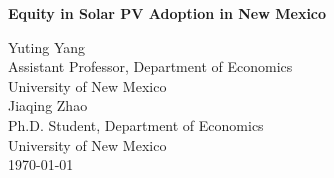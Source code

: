 \begin{titlepage}

\newcommand{\HRule}{\rule{\linewidth}{0.5mm}} %





\begin{center} %



{ \huge \bfseries Equity in Solar PV Adoption in New Mexico}\\ %
\end{center}
\vspace{1.5em}

\begin{center}
    \large
Yuting Yang\\ %
Assistant Professor, Department of Economics\\
University of New Mexico\\
\vspace{1em}
Jiaqing Zhao\\ %
Ph.D. Student, Department of Economics\\
University of New Mexico\\
\vspace{1.5em}
\today


\vspace{1.5em}
\begin{flushleft}
\normalsize


\end{flushleft}
\end{center}
\end{titlepage}
